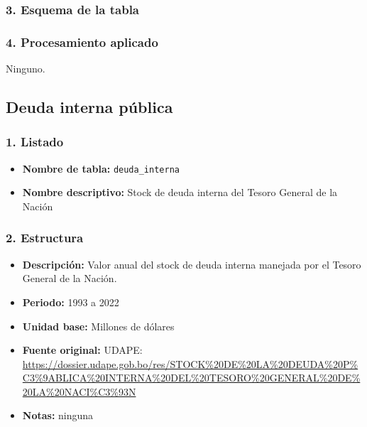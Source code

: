 \documentclass[12pt,a4paper]{article}
\begin{document}
\subsubsection*{3. Esquema de la tabla}

\subsubsection*{4. Procesamiento aplicado}
Ninguno.

\subsection{Deuda interna pública}

\subsubsection*{1. Listado}
\begin{itemize}
  \item \textbf{Nombre de tabla:} \texttt{deuda\_interna}
  \item \textbf{Nombre descriptivo:} Stock de deuda interna del Tesoro General de la Nación
\end{itemize}

\subsubsection*{2. Estructura}
\begin{itemize}
  \item \textbf{Descripción:} Valor anual del stock de deuda interna manejada por el Tesoro General de la Nación.
  \item \textbf{Periodo:} 1993 a 2022
  \item \textbf{Unidad base:} Millones de dólares
  \item \textbf{Fuente original:} UDAPE:\\
    \url{https://dossier.udape.gob.bo/res/STOCK%20DE%20LA%20DEUDA%20P%C3%9ABLICA%20INTERNA%20DEL%20TESORO%20GENERAL%20DE%20LA%20NACI%C3%93N}
  \item \textbf{Notas:} ninguna
\end{itemize}
\end{document}
